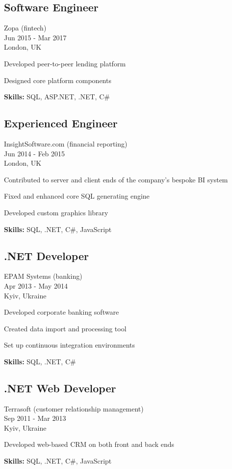 \documentclass[a4paper,10pt]{article}
\begin{document}
\subsection*{Software Engineer}
Zopa (fintech) \\
Jun 2015 - Mar 2017 \\
London, UK
\begin{bulletlist}
    \item Developed peer-to-peer lending platform
    \item Designed core platform components
\end{bulletlist}
\textbf{Skills:} SQL, ASP.NET, .NET, C\#

\subsection*{Experienced Engineer}
InsightSoftware.com (financial reporting) \\
Jun 2014 - Feb 2015 \\
London, UK
\begin{bulletlist}
    \item Contributed to server and client ends of the company's bespoke BI system
    \item Fixed and enhanced core SQL generating engine
    \item Developed custom graphics library
\end{bulletlist}
\textbf{Skills:} SQL, .NET, C\#, JavaScript

\subsection*{.NET Developer}
EPAM Systems (banking) \\
Apr 2013 - May 2014 \\
Kyiv, Ukraine
\begin{bulletlist}
    \item Developed corporate banking software
    \item Created data import and processing tool
    \item Set up continuous integration environments
\end{bulletlist}
\textbf{Skills:} SQL, .NET, C\#

\subsection*{.NET Web Developer}
Terrasoft (customer relationship management) \\
Sep 2011 - Mar 2013 \\
Kyiv, Ukraine
\begin{bulletlist}
    \item Developed web-based CRM on both front and back ends
\end{bulletlist}
\textbf{Skills:} SQL, .NET, C\#, JavaScript
\end{document}
